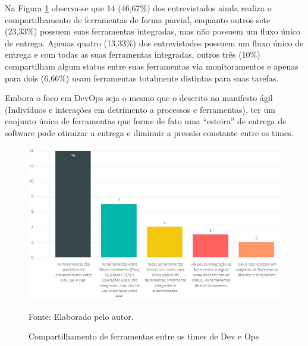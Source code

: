 \documentclass[twoside,english,brazilian]{UNISINOSartigo}
\newcommand{\source}[1]{\caption*{Fonte: {#1}} }
\begin{document}
%
Na Figura \ref{fig:compartFerramentas} observa-se que 14 (46,67\%) dos entrevistados ainda realiza o compartilhamento de ferramentas de forma parcial, enquanto outros sete (23,33\%) possuem suas ferramentas integradas, mas não possuem um fluxo único de entrega. Apenas quatro (13,33\%) dos entrevistados possuem um fluxo único de entrega e com todas as suas ferramentas integradas, outros três (10\%) compartilham algum status entre suas ferramentas via monitoramentos e apenas para dois (6,66\%) usam ferramentas totalmente distintas para suas tarefas.

Embora o foco em DevOps seja o mesmo que o descrito no manifesto ágil (Indivíduos e interações em detrimento a processos e ferramentas), ter um conjunto único de ferramentas que forme de fato uma ``esteira'' de entrega de software pode otimizar a entrega e diminuir a pressão constante entre os times.

\begin{figure}[H]
    \centering
    \caption{Compartilhamento de ferramentas entre os times de Dev e Ops}
       \includegraphics[scale=.6]{imagens/compartilhamentoFerramentas.JPG}
        \source{Elaborado pelo autor.}
    \label{fig:compartFerramentas}
\end{figure}
\end{document}
